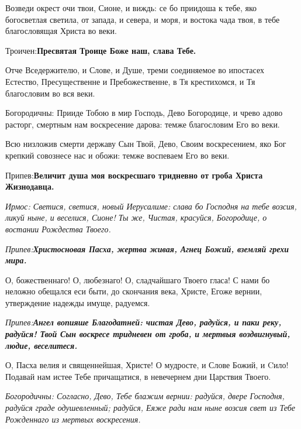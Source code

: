 Возведи окрест очи твои, Сионе, и виждь: се бо приидоша к тебе, яко богосветлая светила, от запада, и севера, и моря, и востока чада твоя, в тебе благословящая Христа во веки. \itshape 

Троичен\normalfont{}:\bfseries  Пресвятая Троице Боже наш, слава Тебе\normalfont{}. 



Отче Вседержителю, и Слове, и Душе, треми соединяемое во ипостасех Естество, Пресущественне и Пребожественне, в Тя крестихомся, и Тя благословим во вся веки. \itshape 

Богородичны\normalfont{}: Прииде Тобою в мир Господь, Дево Богородице, и чрево адово расторг, смертным нам воскресение дарова: темже благословим Его во веки. 



Всю низложив смерти державу Сын Твой, Дево, Своим воскресением, яко Бог крепкий совознесе нас и обожи: темже воспеваем Его во веки. 

\itshape 

Припев\normalfont{}:\bfseries  Величит душа моя воскресшаго тридневно от гроба Христа Жизнодавц\normalfont{}а. 

\itshape Ирмос\normalfont{}: Светися, светися, новый Иерусалиме: слава бо Господня на тебе возсия, ликуй ныне, и веселися, Сионе! Ты же, Чистая, красуйся, Богородице, о востании Рождества Твоего. 

\itshape Припев\normalfont{}:\bfseries  Христо\normalfont{}с\bfseries  новая Пасха, жертва живая, Агнец Божий, вземляй грехи мира\normalfont{}. 





О, божественнаго! О, любезнаго! О, сладчайшаго Твоего гласа! С нами бо неложно обещался еси быти, до скончания века, Христе, Егоже вернии,  утверждение надежды имуще, радуемся. 

\itshape Припев\normalfont{}:\bfseries  Ангел вопияше Благодатней: чистая Дево, радуйся, и паки реку, радуйся! Твой Сын воскресе тридневен от гроба, и мертвыя воздвигнувый, людие, веселитеся. \normalfont{}



О, Пасха велия и священнейшая, Христе! О мудросте, и Слове Божий, и Cило! Подавай нам истее Тебе причащатися, в невечернем дни Царствия Твоего. 

\itshape Богородичны\normalfont{}: Согласно, Дево, Тебе блажим вернии: радуйся, двере Господня, радуйся граде одушевленный; радуйся, Еяже ради нам ныне возсия свет из Тебе Рожденнаго из мертвых воскресения. 





